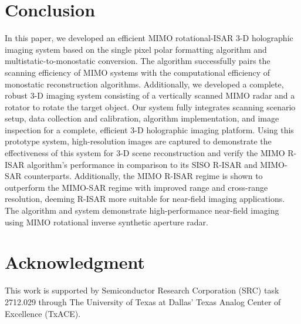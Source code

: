 \documentclass[conference]{IEEEtran}
\begin{document}
		\section{Conclusion}
		\label{Sec_conclusion}
		In this paper, we developed an efficient MIMO rotational-ISAR 3-D holographic imaging system based on the single pixel polar formatting algorithm and multistatic-to-monostatic conversion. The algorithm successfully pairs the scanning efficiency of MIMO systems with the computational efficiency of monostatic reconstruction algorithms. Additionally, we developed a complete, robust 3-D imaging system consisting of a vertically scanned MIMO radar and a rotator to rotate the target object. Our system fully integrates scanning scenario setup, data collection and calibration, algorithm implementation, and image inspection for a complete, efficient 3-D holographic imaging platform. Using this prototype system, high-resolution images are captured to demonstrate the effectiveness of this system for 3-D scene reconstruction and verify the MIMO R-ISAR algorithm's performance in comparison to its SISO R-ISAR and MIMO-SAR counterparts. Additionally, the MIMO R-ISAR regime is shown to outperform the MIMO-SAR regime with improved range and cross-range resolution, deeming R-ISAR more suitable for near-field imaging applications. The algorithm and system demonstrate high-performance near-field imaging using MIMO rotational inverse synthetic aperture radar.
		
		
		\section*{Acknowledgment}
		This work is supported by Semiconductor Research Corporation (SRC) task 2712.029 through The University of Texas at Dallas' Texas Analog Center of Excellence (TxACE).
		
		
		
		
		
	
\end{document}
